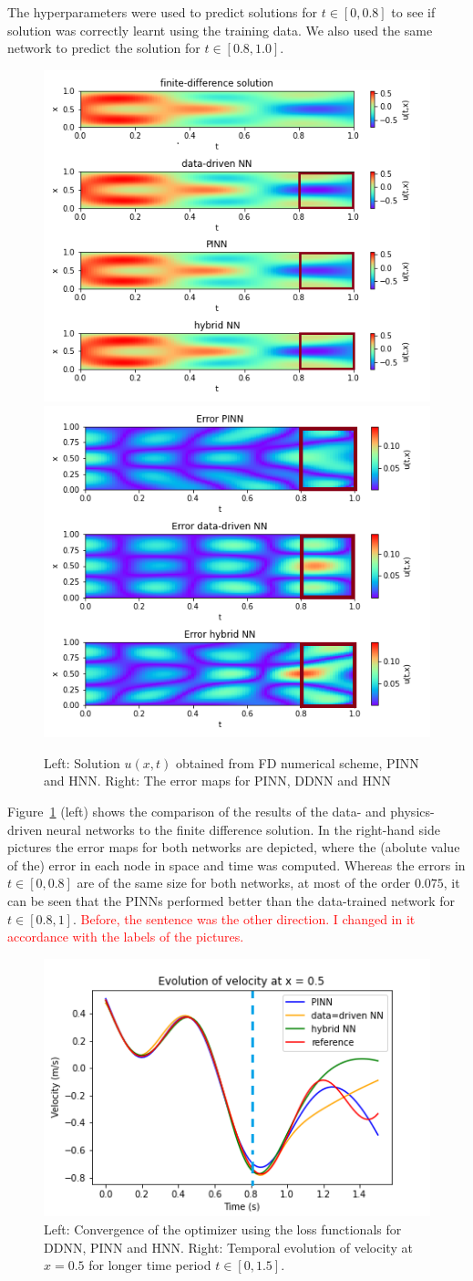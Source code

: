 The hyperparameters were used to predict solutions for $t \in [0,0.8]$ to see if solution was correctly learnt using the training data. We also used the same network to predict the solution for $t \in [0.8,1.0]$.

\begin{figure}[t!]
\begin{center}
\includegraphics[width=0.4\linewidth]{../Code/B1/plots/colormap.png}
\includegraphics[width=0.3\linewidth]{../Code/B1/plots/error_colormap.png}
\end{center}
\caption{Left: Solution $u(x,t)$ obtained from FD numerical scheme, PINN and HNN. Right: The error maps for PINN, DDNN and HNN}
\label{fig:wave_sol_error}
\end{figure}

Figure~\ref{fig:wave_sol_error} (left) shows the comparison of the results of the 
data- and physics-driven neural networks to the finite difference solution. 
In the right-hand side pictures the error maps for both networks are depicted, where the 
(abolute value of the) error in each node in space and time was computed. 
Whereas the errors in $t\in[0,0.8]$ are of the same size for both networks, at most of the order $0.075$,
it can be seen that the PINNs performed better than the data-trained network for $t\in[0.8,1]$.
\textcolor{red}{Before, the sentence was the other direction. I changed in it accordance with the labels 
of the pictures.}

\begin{figure}[t!]
\begin{center}
\includegraphics[width=0.45\linewidth]{../Code/B1/plots/evolution_plot.png}
\end{center}
\caption{Left: Convergence of the optimizer using the loss functionals for DDNN, PINN and HNN. Right: Temporal evolution of velocity at $x=0.5$ for longer time period $t\in [0,1.5]$.}
\label{fig:wave_evolution}
\end{figure}

